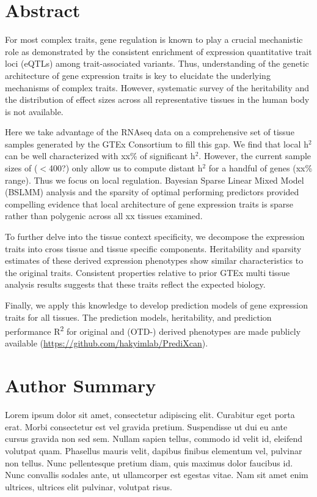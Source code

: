 \documentclass[10pt,letterpaper]{article}
\begin{document}
\section*{Abstract}
For most complex traits, gene regulation is known to play a crucial mechanistic role as demonstrated by the consistent enrichment of expression quantitative trait loci (eQTLs) among trait-associated variants. Thus, understanding of the genetic architecture of gene expression traits is key to elucidate the underlying mechanisms of complex traits. However, systematic survey of the heritability and the distribution of effect sizes across all representative tissues in the human body is not available.

Here we take advantage of the RNAseq data on a comprehensive set of tissue samples generated by the GTEx Consortium to fill this gap. We find that local h$^2$ can be well characterized with xx\% of significant h$^2$. However, the current sample sizes of ($<$400?) only allow us to compute distant h$^2$ for a handful of genes (xx\% range). Thus we focus on local regulation. Bayesian Sparse Linear Mixed Model (BSLMM) analysis and the sparsity of optimal performing predictors provided compelling evidence that local architecture of gene expression traits is sparse rather than polygenic across all xx tissues examined.

To further delve into the tissue context specificity, we decompose the expression traits into cross tissue and tissue specific components. Heritability and sparsity estimates of these derived expression phenotypes show similar characteristics to the original traits. Consistent properties relative to prior GTEx multi tissue analysis results suggests that these traits reflect the expected biology.

Finally, we apply this knowledge to develop prediction models of gene
expression traits for all tissues. The prediction models, heritability, and prediction performance R\textsuperscript{2} for original and (OTD-) derived phenotypes are made publicly available (\url{https://github.com/hakyimlab/PrediXcan}).


\section*{Author Summary}
Lorem ipsum dolor sit amet, consectetur adipiscing elit. Curabitur eget porta erat. Morbi consectetur est vel gravida pretium. Suspendisse ut dui eu ante cursus gravida non sed sem. Nullam sapien tellus, commodo id velit id, eleifend volutpat quam. Phasellus mauris velit, dapibus finibus elementum vel, pulvinar non tellus. Nunc pellentesque pretium diam, quis maximus dolor faucibus id. Nunc convallis sodales ante, ut ullamcorper est egestas vitae. Nam sit amet enim ultrices, ultrices elit pulvinar, volutpat risus.
\end{document}
